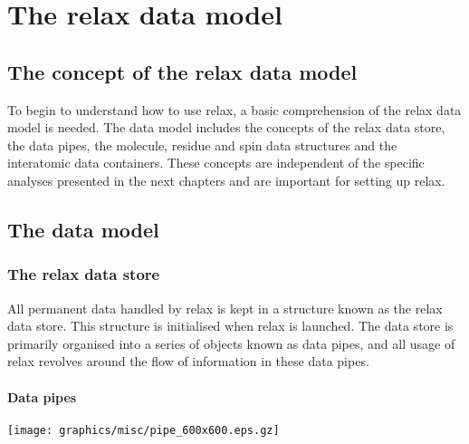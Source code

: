 
\chapter{The relax data model} \label{ch: data model}



\section{The concept of the relax data model}

To begin to understand how to use relax, a basic comprehension of the relax data model is needed.  The data model includes the concepts of the relax data store, the data pipes, the molecule, residue and spin data structures and the interatomic data containers.  These concepts are independent of the specific analyses presented in the next chapters and are important for setting up relax.




\section{The data model}



\subsection{The relax data store}

All permanent data handled by relax is kept in a structure known as the relax data store.  This structure is initialised when relax is launched.  The data store is primarily organised into a series of objects known as data pipes, and all usage of relax revolves around the flow of information in these data pipes.


\subsubsection{Data pipes}

\begin{figure*}[h]
\texttt{[image: graphics/misc/pipe\_600x600.eps.gz]}
\end{figure*}

